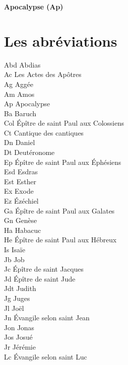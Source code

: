 \documentclass [11pt]{article}
\begin{document}
		\noindent \textbf{Apocalypse (Ap)}
		
		
	\section*{Les abréviations}
		
		\small

	
		Abd \tabto{5em} Abdias\\
		Ac \tabto{5em} Les Actes des Apôtres\\
		Ag \tabto{5em} Aggée\\
		Am \tabto{5em} Amos\\
		Ap \tabto{5em} Apocalypse\\
		Ba \tabto{5em} Baruch\\
		Col \tabto{5em} Épître de saint Paul aux Colossiens\\
		Ct \tabto{5em} Cantique des cantiques\\
		Dn \tabto{5em} Daniel\\
		Dt \tabto{5em} Deutéronome\\
		Ep \tabto{5em} Épître de saint Paul aux Éphésiens\\
		Esd \tabto{5em} Esdras\\
		Est \tabto{5em} Esther\\
		Ex \tabto{5em} Exode\\
		Ez \tabto{5em} Ézéchiel\\
		Ga \tabto{5em} Épître de saint Paul aux Galates\\
		Gn \tabto{5em} Genèse\\
		Ha \tabto{5em} Habacuc\\
		He \tabto{5em} Épître de saint Paul aux Hébreux\\
		Is \tabto{5em} Isaïe\\
		Jb \tabto{5em} Job\\
		Jc \tabto{5em} Épître de saint Jacques\\
		Jd \tabto{5em} Épître de saint Jude\\
		\noindent Jdt \tabto{5em} Judith\\
		Jg \tabto{5em} Juges\\
		Jl \tabto{5em} Joël\\
		Jn \tabto{5em} Évangile selon saint Jean\\
		Jon \tabto{5em} Jonas\\
		Jos \tabto{5em} Josué\\
		Jr \tabto{5em} Jérémie\\
		Lc \tabto{5em} Évangile selon saint Luc
	\filbreak
\end{document}
